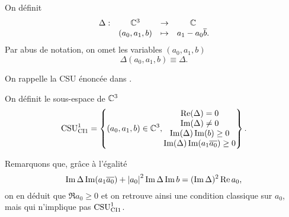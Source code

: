     On définit 
    \begin{equation}
      \label{eq:unicite:delta}
      \begin{matrix}
        \Delta: & \CC^3 &\rightarrow& \CC
        \\
        & (a_0,a_1,b) & \mapsto & a_1 - a_0\conj{b}.
      \end{matrix}
    \end{equation}
    Par abus de notation, on omet les variables \((a_0,a_1,b)\)
    \begin{equation}
       \Delta(a_0,a_1,b) \equiv \Delta.
    \end{equation}

    On rappelle la CSU énoncée dans \cite{stupfel_sufficient_2011}.

    \begin{defn}
      \label{def:csu:ci1-1}

      On définit le sous-espace de \(\CC^3\)
      \begin{equation*}
        \CSU[1]{CI1} = \left\lbrace 
        (a_0,a_1,b) \in \CC^3,
        \begin{matrix}
        \Re(\Delta) = 0
        \\
        \Im(\Delta) \not = 0
        \\
        \Im(\Delta)\Im(b) \ge 0
        \\
        \Im(\Delta )\Im(a_1\conj{a_0})\ge 0
        \end{matrix}
        \right\rbrace.
      \end{equation*}

      Remarquons que, grâce à l'égalité
      \[
      \Im \Delta \Im (a_1\conj{a_0})+\abs{a_0}^2\Im\Delta \Im b = (\Im \Delta)^2\Re a_0,
      \]
      on en déduit que \(\Re a_0\geq 0\) et on retrouve ainsi une condition classique sur \(a_0\), mais qui n'implique pas \(\CSU[1]{CI1}\).

    \end{defn}


